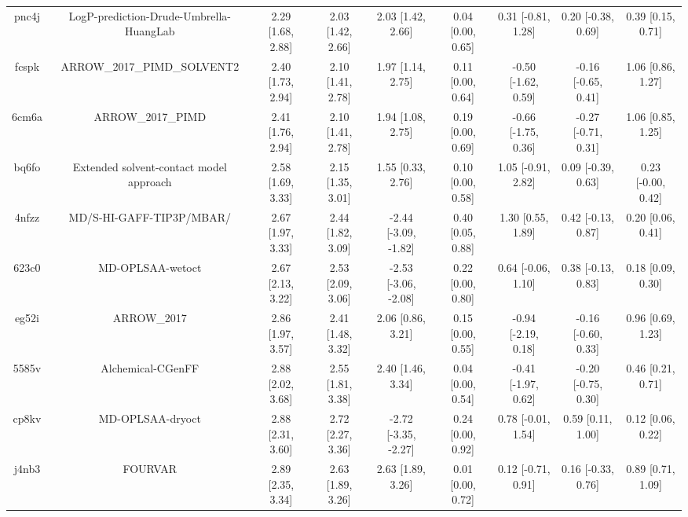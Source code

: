 \documentclass{article}
\begin{document}
\begin{center}
\begin{longtable}{|ccccccccc|}
 pnc4j &            LogP-prediction-Drude-Umbrella-HuangLab &  2.29 [1.68, 2.88] &  2.03 [1.42, 2.66] &     2.03 [1.42, 2.66] &  0.04 [0.00, 0.65] &   0.31 [-0.81, 1.28] &   0.20 [-0.38, 0.69] &     0.39 [0.15, 0.71] \\
 fcspk &                        ARROW\_2017\_PIMD\_SOLVENT2 &  2.40 [1.73, 2.94] &  2.10 [1.41, 2.78] &     1.97 [1.14, 2.75] &  0.11 [0.00, 0.64] &  -0.50 [-1.62, 0.59] &  -0.16 [-0.65, 0.41] &     1.06 [0.86, 1.27] \\
 6cm6a &                                  ARROW\_2017\_PIMD &  2.41 [1.76, 2.94] &  2.10 [1.41, 2.78] &     1.94 [1.08, 2.75] &  0.19 [0.00, 0.69] &  -0.66 [-1.75, 0.36] &  -0.27 [-0.71, 0.31] &     1.06 [0.85, 1.25] \\
 bq6fo &            Extended solvent-contact model approach &  2.58 [1.69, 3.33] &  2.15 [1.35, 3.01] &     1.55 [0.33, 2.76] &  0.10 [0.00, 0.58] &   1.05 [-0.91, 2.82] &   0.09 [-0.39, 0.63] &    0.23 [-0.00, 0.42] \\
 4nfzz &                           MD/S-HI-GAFF-TIP3P/MBAR/ &  2.67 [1.97, 3.33] &  2.44 [1.82, 3.09] &  -2.44 [-3.09, -1.82] &  0.40 [0.05, 0.88] &    1.30 [0.55, 1.89] &   0.42 [-0.13, 0.87] &     0.20 [0.06, 0.41] \\
 623c0 &                                   MD-OPLSAA-wetoct &  2.67 [2.13, 3.22] &  2.53 [2.09, 3.06] &  -2.53 [-3.06, -2.08] &  0.22 [0.00, 0.80] &   0.64 [-0.06, 1.10] &   0.38 [-0.13, 0.83] &     0.18 [0.09, 0.30] \\
 eg52i &                                        ARROW\_2017 &  2.86 [1.97, 3.57] &  2.41 [1.48, 3.32] &     2.06 [0.86, 3.21] &  0.15 [0.00, 0.55] &  -0.94 [-2.19, 0.18] &  -0.16 [-0.60, 0.33] &     0.96 [0.69, 1.23] \\
 5585v &                                  Alchemical-CGenFF &  2.88 [2.02, 3.68] &  2.55 [1.81, 3.38] &     2.40 [1.46, 3.34] &  0.04 [0.00, 0.54] &  -0.41 [-1.97, 0.62] &  -0.20 [-0.75, 0.30] &     0.46 [0.21, 0.71] \\
 cp8kv &                                   MD-OPLSAA-dryoct &  2.88 [2.31, 3.60] &  2.72 [2.27, 3.36] &  -2.72 [-3.35, -2.27] &  0.24 [0.00, 0.92] &   0.78 [-0.01, 1.54] &    0.59 [0.11, 1.00] &     0.12 [0.06, 0.22] \\
 j4nb3 &                                            FOURVAR &  2.89 [2.35, 3.34] &  2.63 [1.89, 3.26] &     2.63 [1.89, 3.26] &  0.01 [0.00, 0.72] &   0.12 [-0.71, 0.91] &   0.16 [-0.33, 0.76] &     0.89 [0.71, 1.09] \\

\end{longtable}
\end{center}
\end{document}

